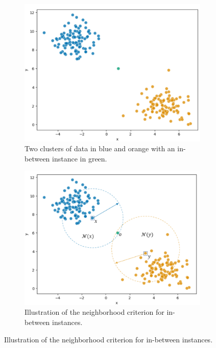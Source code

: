 \begin{figure}[htbp]
    \centering
    \begin{subfigure}[b]{0.475\textwidth}
        \includegraphics[width=\textwidth]{images/ibi_raw.png}
        \caption{Two clusters of data in blue and orange with an in-between instance in green.}
        \label{fig:ibi_raw}
    \end{subfigure}
    \hfill
    \begin{subfigure}[b]{0.475\textwidth}
        \includegraphics[width=\textwidth]{images/ibi_neighbor.png}
        \caption{Illustration of the neighborhood criterion for in-between instances.}
        \label{fig:ibi_neighbor}
    \end{subfigure}

\end{figure}
